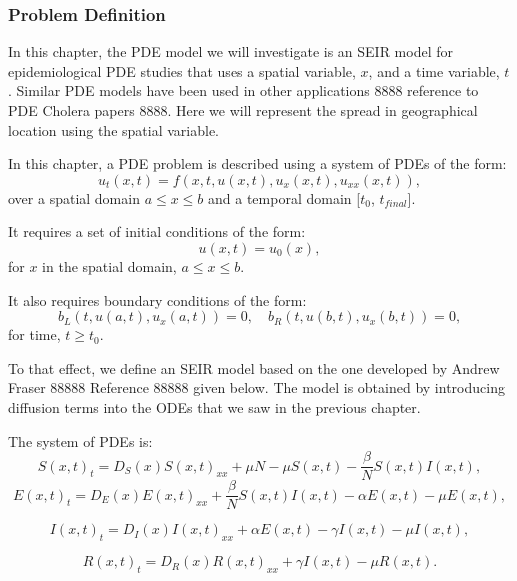 \documentclass{article}
\begin{document}
\subsubsection{Problem Definition}
\label{subsection:pde_problem_def}
In this chapter, the PDE model we will investigate is an SEIR model for epidemiological PDE studies that uses a spatial variable, $x$, and a time variable, $t$. Similar PDE models have been used in other applications 8888 reference to PDE Cholera papers 8888. Here we will represent the spread in geographical location using the spatial variable.

In this chapter, a PDE problem is described using a system of PDEs of the form:
\begin{equation}
u_t(x, t) = f(x, t, u(x,t), u_x(x,t), u_{xx}(x,t)),
\end{equation} 
over a spatial domain ${a \leq x \leq b}$ and a temporal domain [${t_0}$, $t_{final}$]. 

It requires a set of initial conditions of the form:
\begin{equation}
u(x, t) = u_0(x),
\end{equation}
for $x$ in the spatial domain, ${a \leq x \leq b}$.

It also requires boundary conditions of the form:
\begin{equation}
b_L(t, u(a,t), u_x(a,t)) = 0, \quad b_R(t, u(b,t), u_x(b,t)) = 0,
\end{equation} 
for time, $t \geq t_0$.

To that effect, we define an SEIR model based on the one developed by Andrew Fraser 88888 Reference 88888 given below. The model is obtained by introducing diffusion terms into the ODEs that we saw in the previous chapter.

The system of PDEs is:
\begin{equation}
S(x, t)_t = D_S(x)S(x, t)_{xx} + \mu N - \mu S(x, t) - \frac{\beta}{N}S(x, t)I(x, t),
\end{equation}
\begin{equation}
E(x, t)_t = D_E(x)E(x, t)_{xx} + \frac{\beta}{N}S(x, t)I(x, t) - \alpha E(x, t) - \mu E(x, t),
\end{equation}

\begin{equation}
I(x, t)_t = D_I(x)I(x, t)_{xx} + \alpha E(x, t) - \gamma I(x, t) - \mu I(x, t),
\end{equation}

\begin{equation}
R(x, t)_t = D_R(x)R(x, t)_{xx} + \gamma I(x, t) - \mu R(x, t).
\end{equation} 
\end{document}
